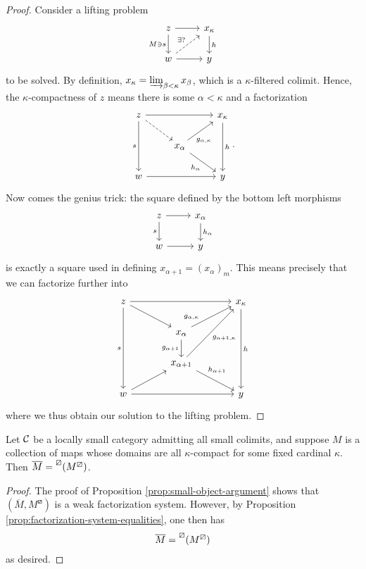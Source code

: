 \begin{proof}
Consider a lifting problem
\[
	\begin{tikzcd}
		z\ar[d,"M \ni s"']\ar[r] & x_\kappa\ar[d,"h"] \\
		w\ar[r]\ar[ur,dashed,"\exists?"] & y
	\end{tikzcd}
\]
to be solved. By definition, \(x_\kappa = \injlim_{\beta < \kappa}x_\beta\), which is a \(\kappa\)-filtered colimit. Hence, the \(\kappa\)-compactness of \(z\) means there is some
\(\alpha < \kappa\) and a factorization
\[
	\begin{tikzcd}
		z\ar[dd,"s"']\ar[rr]\ar[dr,dashed] & & x_\kappa\ar[dd,"h"] \\
		& x_\alpha\ar[dr,"h_\alpha"']\ar[ur,"g_{\alpha,\kappa}"' near start] & \\
		w\ar[rr] & & y
	\end{tikzcd}.
\]
Now comes the genius trick: the square defined by the bottom left morphisms
\[
	\begin{tikzcd}
		z\ar[d,"s"']\ar[r] & x_\alpha \ar[d,"h_\alpha"] \\
		w \ar[r] & y
	\end{tikzcd}
\]
is exactly a square used in defining \(x_{\alpha+1} = (x_{\alpha})_m\). This means precisely that we can factorize further into
\[
	\begin{tikzcd}[column sep=large]
		z\ar[ddd,"s"']\ar[rr]\ar[dr] & & x_\kappa\ar[ddd,"h"] \\
		& x_\alpha\ar[d,"g_{\alpha+1}"']\ar[ur,"g_{\alpha,\kappa}" near start] & \\
		& x_{\alpha+1}\ar[dr,"h_{\alpha+1}" near start]\ar[uur,"g_{\alpha+1,\kappa}"'] & \\
		w\ar[rr]\ar[ur] & & y
	\end{tikzcd}
\]
where we thus obtain our solution to the lifting problem.
\end{proof}
\begin{corollary}
	Let \(\calC\) be a locally small category admitting all small colimits, and suppose \(M\) is a collection of maps whose domains are all \(\kappa\)-compact for some fixed cardinal \(\kappa\).
	Then \(\overline{M} = \prescript{\boxslash}{}{(M^\boxslash)}\).
\end{corollary}
\begin{proof}
The proof of Proposition \ref{prop:small-object-argument} shows that \((\overline{M},M^\boxslash)\) is a weak factorization system. However, by Proposition \ref{prop:factorization-system-equalities},
one then has
\[ \overline{M} = \prescript{\boxslash}{}{(M^\boxslash)} \]
as desired.
\end{proof}
